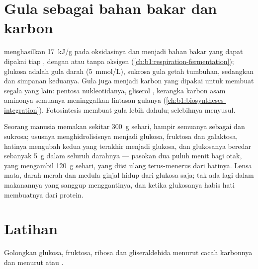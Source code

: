 \section{Gula sebagai bahan bakar dan karbon}

\begin{proposition}\label{prop:b1:carbohydrates:fuel}
 menghasilkan \qty{17}{kJ/g} pada oksidasinya dan menjadi
bahan bakar yang dapat dipakai tiap , dengan atau tanpa oksigen
(\cref{ch:b1:respiration-fermentation}); glukosa adalah gula darah
(\qty{5}{mmol/L}), sukrosa gula getah tumbuhan, sedangkan  dan
 simpanan keduanya. Gula juga menjadi karbon yang dipakai 
untuk membuat segala yang lain: pentosa nukleotidanya, gliserol
, kerangka karbon asam aminonya semuanya meninggalkan lintasan
gulanya (\cref{ch:b1:biosyntheses-integration}). Fotosintesis membuat
gula lebih dahulu; selebihnya menyusul.
\end{proposition}

\begin{example}\label{ex:b1:carbohydrates:day}
Seorang manusia memakan sekitar \qty{300}{g}  sehari, hampir
semuanya sebagai  dan sukrosa; ususnya menghidrolisisnya menjadi
glukosa, fruktosa dan galaktosa, hatinya mengubah kedua yang terakhir
menjadi glukosa, dan glukosanya beredar sebanyak \qty{5}{g} dalam
seluruh darahnya --- pasokan dua puluh menit bagi otak, yang mengambil
\qty{120}{g} sehari, yang diisi ulang terus-menerus dari 
hatinya. Lensa mata,  darah merah dan medula ginjal hidup dari
glukosa saja; tak ada lagi dalam makanannya yang sanggup menggantinya,
dan ketika glukosanya habis hati membuatnya dari protein.
\end{example}

\section{Latihan}

\begin{exercise}[$\star$]\label{exo:b1:carbohydrates:1}
Golongkan glukosa, fruktosa, ribosa dan gliseraldehida menurut cacah
karbonnya dan menurut  atau .
\end{exercise}


